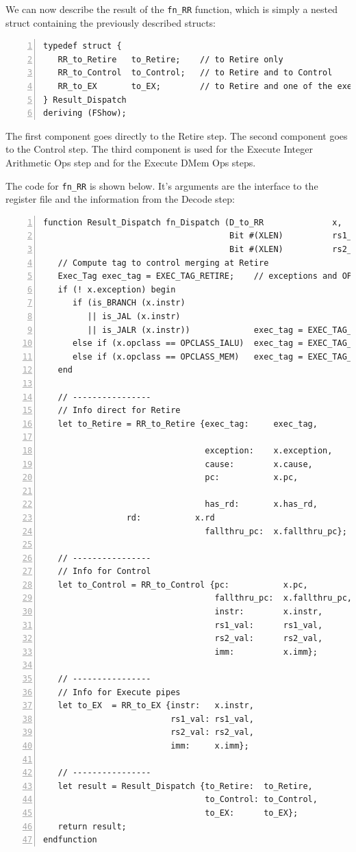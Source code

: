 We can now describe the result of the \verb|fn_RR| function, which is
simply a nested struct containing the previously described structs:

{\small
\begin{Verbatim}[frame=single, numbers=left]
typedef struct {
   RR_to_Retire   to_Retire;    // to Retire only
   RR_to_Control  to_Control;   // to Retire and to Control
   RR_to_EX       to_EX;        // to Retire and one of the execute pipes
} Result_Dispatch
deriving (FShow);
\end{Verbatim}
}

The first component goes directly to the Retire step.  The second
component goes to the Control step.  The third component is used for
the Execute Integer Arithmetic Ops step and for the Execute DMem Ops
steps.

The code for \verb|fn_RR| is shown below.  It's arguments are the
interface to the register file and the information from the Decode
step:

{\small
\begin{Verbatim}[frame=single, numbers=left]
function Result_Dispatch fn_Dispatch (D_to_RR              x,
                                      Bit #(XLEN)          rs1_val,
                                      Bit #(XLEN)          rs2_val);
   // Compute tag to control merging at Retire
   Exec_Tag exec_tag = EXEC_TAG_RETIRE;    // exceptions and OPCLASS_SYSTEM
   if (! x.exception) begin
      if (is_BRANCH (x.instr)
         || is_JAL (x.instr)
         || is_JALR (x.instr))             exec_tag = EXEC_TAG_CONTROL;
      else if (x.opclass == OPCLASS_IALU)  exec_tag = EXEC_TAG_IALU;
      else if (x.opclass == OPCLASS_MEM)   exec_tag = EXEC_TAG_DMEM;
   end

   // ----------------
   // Info direct for Retire
   let to_Retire = RR_to_Retire {exec_tag:     exec_tag,

                                 exception:    x.exception,
                                 cause:        x.cause,
                                 pc:           x.pc,

                                 has_rd:       x.has_rd,
				 rd:           x.rd
                                 fallthru_pc:  x.fallthru_pc};

   // ----------------
   // Info for Control
   let to_Control = RR_to_Control {pc:           x.pc,
                                   fallthru_pc:  x.fallthru_pc,
                                   instr:        x.instr,
                                   rs1_val:      rs1_val,
                                   rs2_val:      rs2_val,
                                   imm:          x.imm};

   // ----------------
   // Info for Execute pipes
   let to_EX  = RR_to_EX {instr:   x.instr,
                          rs1_val: rs1_val,
                          rs2_val: rs2_val,
                          imm:     x.imm};

   // ----------------
   let result = Result_Dispatch {to_Retire:  to_Retire,
                                 to_Control: to_Control,
                                 to_EX:      to_EX};
   return result;
endfunction
\end{Verbatim}
}

